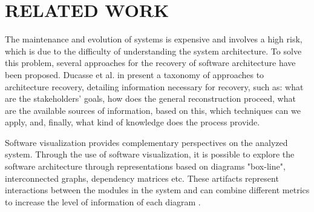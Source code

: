 \documentclass{sig-alternate-05-2015}
\begin{document}


%
%

%
%
\printccsdesc





\section{RELATED WORK}\label{sec:related}%



The maintenance and evolution of systems is expensive and involves a high risk, which is due to the difficulty of understanding the system architecture. To solve this problem, several approaches for the recovery of software architecture have been proposed. Ducasse et al. in \cite{ducasse_software_2009} present a taxonomy of approaches to architecture recovery, detailing information necessary for recovery, such as: what are the stakeholders’ goals, how does the general reconstruction proceed, what are the available sources of information, based on this, which techniques can we apply, and, finally, what kind of knowledge does the process provide.

Software visualization provides complementary perspectives on the analyzed system. Through the use of software visualization, it is possible to explore the software architecture through representations based on diagrams "box-line", interconnected graphs, dependency matrices etc. These artifacts represent interactions between the modules in the system and can combine different metrics to increase the level of information of each diagram \cite{ lungu_lanza_2007}.
\end{document}
